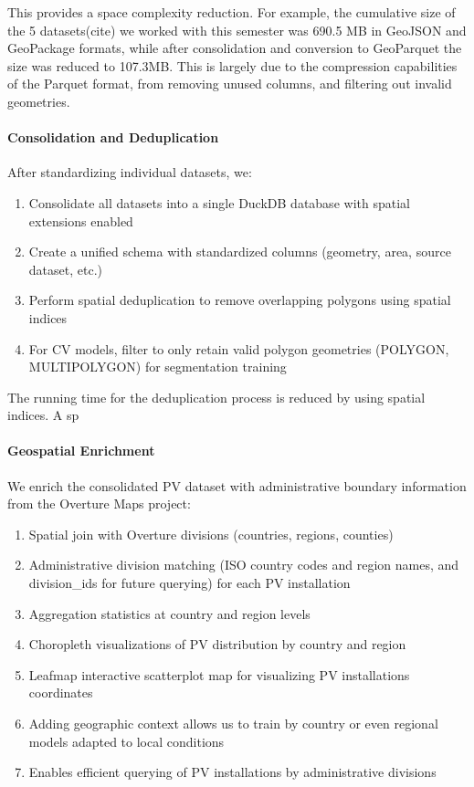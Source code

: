 \begin{multicols}{2}
This provides a space complexity reduction. For example, the cumulative size of the 5 datasets(cite) we worked with this semester was 690.5 MB in GeoJSON and GeoPackage formats, 
while after consolidation and conversion to GeoParquet the size was reduced to 107.3MB. This is largely due to the compression capabilities of the Parquet format, from removing unused columns, 
and filtering out invalid geometries. 

\paragraph{Consolidation and Deduplication}
After standardizing individual datasets, we:
\begin{enumerate}
    \item Consolidate all datasets into a single DuckDB database with spatial extensions enabled
    \item Create a unified schema with standardized columns (geometry, area, source dataset, etc.)
    \item Perform spatial deduplication to remove overlapping polygons using spatial indices
    \item For CV models, filter to only retain valid polygon geometries (POLYGON, MULTIPOLYGON) for segmentation training
\end{enumerate}

The running time for the deduplication process is reduced by using spatial indices. A sp 


\paragraph{Geospatial Enrichment}
We enrich the consolidated PV dataset with administrative boundary information from the Overture Maps project:
\begin{enumerate}
    \item Spatial join with Overture divisions (countries, regions, counties)
    \item Administrative division matching (ISO country codes and region names, and division\_ids for future querying) for each PV installation
    \item Aggregation statistics at country and region levels
    \item Choropleth visualizations of PV distribution by country and region
    \item Leafmap interactive scatterplot map for visualizing PV installations coordinates
    \item Adding geographic context allows us to train by country or even regional models adapted to local conditions
    \item Enables efficient querying of PV installations by administrative divisions
\end{enumerate}


\end{multicols}
